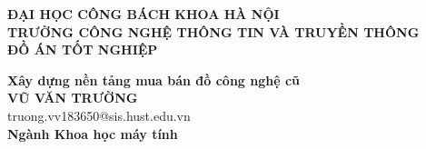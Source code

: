 \documentclass[DoAn.tex]{subfiles}
\begin{document}
\begin{titlepage}
\thispagestyle{empty}
\begin{center}

{\textbf{\large{ĐẠI HỌC CÔNG BÁCH KHOA HÀ NỘI}}}\\[0.5cm]
{\textbf{\large{TRƯỜNG CÔNG NGHỆ THÔNG TIN VÀ TRUYỀN THÔNG}}}\\[4cm]

{\textbf{\huge{ ĐỒ ÁN TỐT NGHIỆP}}}\\[1cm]
{\textbf{\Large{Xây dựng nền tảng mua bán đồ công nghệ cũ}}\\[1cm]

{\textbf{\large{VŨ VĂN TRƯỜNG}}}\\
{\large{truong.vv183650@sis.hust.edu.vn}}\\[0.5cm]

{\textbf{\large{Ngành Khoa học máy tính}}}\\

\vspace{2cm}
\begin{table}[H]
\centering
{}
\end{table}}
\end{center}



\end{titlepage}
\end{document}
